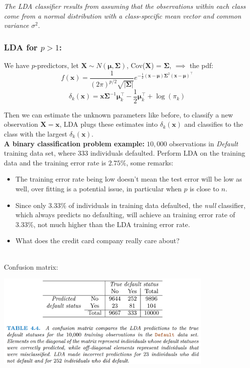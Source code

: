 \documentclass[11pt]{article}
\begin{document}
\noindent \textit{The LDA classifier results from assuming that the observations within each class come from a normal distribution with a class-specific mean vector and common variance $\sigma^2$}.

\subsubsection{LDA for $p > 1$:}
\noindent We have $p$-predictors, let $\boldsymbol{X} \sim N(\boldsymbol{\mu}, \boldsymbol{\Sigma})$, Cov($\boldsymbol{X}$) = $\boldsymbol{\Sigma}$, $\implies$ the pdf:
$$f(\boldsymbol{x}) = \frac{1}{(2\pi)^{p/2}\sqrt{|\boldsymbol{\Sigma}|}}e^{-\frac{1}{2}(\boldsymbol{x} - \boldsymbol{\mu})\boldsymbol{\Sigma}^2(\boldsymbol{x} - \boldsymbol{\mu})^\top}$$
$$\delta_k(\boldsymbol{x}) = \boldsymbol{x}\boldsymbol{\Sigma}^{-1}\boldsymbol{\mu}_k^\top - \frac{1}{2}\boldsymbol{\mu}_k^{\top} + \log(\pi_k)$$

\noindent Then we can estimate the unknown parameters like before, to classify a new observation $\boldsymbol{X} = \boldsymbol{x}$, LDA plugs these estimates into $\delta_k(\boldsymbol{x})$ and classifies to the class with the largest $\delta_k(\boldsymbol{x})$. \\

\noindent \textbf{A binary classification problem example:} $10,000$ observations in \textit{Default} training data set, where $333$ individuals defaulted. Perform LDA on the training data and the training error rate is $2.75\%$, some remarks:
\begin{itemize}
    \item The training error rate being low doesn't mean the test error will be low as well, over fitting is a potential issue, in particular when $p$ is close to $n$.
    \item Since only $3.33\%$ of individuals in training data defaulted, the \textit{null} classifier, which always predicts no defaulting, will achieve an training error rate of $3.33\%$, not much higher than the LDA training error rate.
    \item  What does the credit card company really care about?
\end{itemize}
\phantom{i} \\
\noindent Confusion matrix:
\begin{center}
  \includegraphics[width=0.8\textwidth]{LDA Example Confusion Matrix.png}
\end{center}
\end{document}
